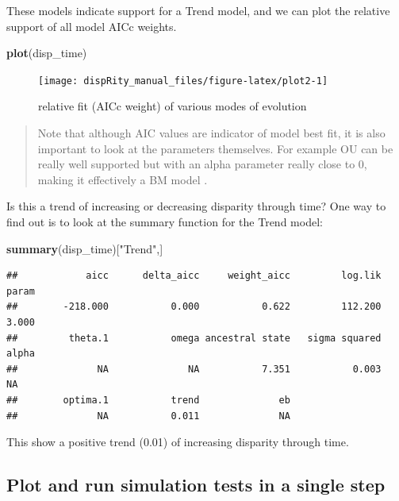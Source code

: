 \documentclass[]{book}
\newenvironment{Shaded}{\begin{snugshade}}{\end{snugshade}}
\newcommand{\KeywordTok}[1]{\textcolor[rgb]{0.13,0.29,0.53}{\textbf{#1}}}
\newcommand{\NormalTok}[1]{#1}
\newcommand{\StringTok}[1]{\textcolor[rgb]{0.31,0.60,0.02}{#1}}
\begin{document}
These models indicate support for a Trend model, and we can plot the relative support of all model AICc weights.

\begin{Shaded}
\begin{Highlighting}[]
\KeywordTok{plot}\NormalTok{(disp_time)}
\end{Highlighting}
\end{Shaded}

\begin{figure}

{\centering \texttt{[image: dispRity\_manual\_files/figure-latex/plot2-1]} 

}

\caption{relative fit (AICc weight) of various modes of evolution}\label{fig:plot2}
\end{figure}

\begin{quote}
Note that although AIC values are indicator of model best fit, it is also important to look at the parameters themselves.
For example OU can be really well supported but with an alpha parameter really close to 0, making it effectively a BM model \citep{Cooper2016}.
\end{quote}

Is this a trend of increasing or decreasing disparity through time? One way to find out is to look at the summary function for the Trend model:

\begin{Shaded}
\begin{Highlighting}[]
\KeywordTok{summary}\NormalTok{(disp_time)[}\StringTok{"Trend"}\NormalTok{,]}
\end{Highlighting}
\end{Shaded}

\begin{verbatim}
##            aicc      delta_aicc     weight_aicc         log.lik           param 
##        -218.000           0.000           0.622         112.200           3.000 
##         theta.1           omega ancestral state   sigma squared           alpha 
##              NA              NA           7.351           0.003              NA 
##        optima.1           trend              eb 
##              NA           0.011              NA
\end{verbatim}

This show a positive trend (0.01) of increasing disparity through time.

\hypertarget{plot-and-run-simulation-tests-in-a-single-step}{%
\subsection{Plot and run simulation tests in a single step}\label{plot-and-run-simulation-tests-in-a-single-step}}
\end{document}
